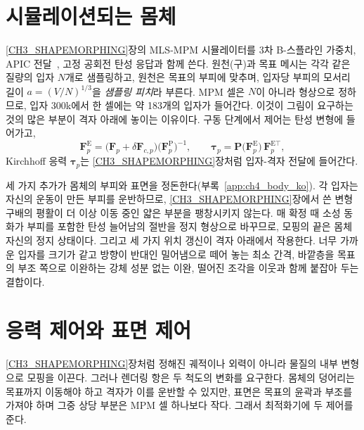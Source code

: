 \section{시뮬레이션되는 몸체}
\label{ch4:sec_body_ko}

\ref{CH3_SHAPEMORPHING}장의 MLS-MPM 시뮬레이터를 3차 B-스플라인 가중치, APIC 전달~\citep{jiang2016material}, 고정 공회전
탄성 응답과 함께 쓴다. 원천(구)과 목표 메시는 각각 같은 질량의 입자 $N$개로 샘플링하고, 원천은 목표의 부피에 맞추며,
입자당 부피의 모서리 길이 $a=(V/N)^{1/3}$을 \emph{샘플링 피치}라 부른다. MPM 셀은 $N$이 아니라 형상으로 정하므로, 입자
300k에서 한 셀에는 약 183개의 입자가 들어간다. 이것이 그림이 요구하는 것의 많은 부분이 격자 아래에 놓이는 이유이다. 구동
단계에서 제어는 탄성 변형에 들어가고,
\begin{equation}
\label{eq:control_F_ko}
\mathbf{F}^{\mathrm{E}}_p=\big(\mathbf{F}_p+\delta\mathbf{F}_{c,p}\big)\big(\mathbf{F}^{\mathrm{P}}_p\big)^{-1},
\qquad
\boldsymbol{\tau}_p=\mathbf{P}\big(\mathbf{F}^{\mathrm{E}}_p\big)\,\mathbf{F}^{\mathrm{E}\top}_p ,
\end{equation}
Kirchhoff 응력 $\boldsymbol{\tau}_p$는 \ref{CH3_SHAPEMORPHING}장처럼 입자-격자 전달에 들어간다.

세 가지 추가가 몸체의 부피와 표면을 정돈한다(부록~\ref{app:ch4_body_ko}). 각 입자는 자신의 운동이 만든 부피를 운반하므로,
\ref{CH3_SHAPEMORPHING}장에서 쓴 변형 구배의 평활이 더 이상 이동 중인 얇은 부분을 팽창시키지 않는다. 매 확정 때 소성 동화가
부피를 포함한 탄성 늘어남의 절반을 정지 형상으로 바꾸므로, 모핑의 끝은 몸체 자신의 정지 상태이다. 그리고 세 가지 위치
갱신이 격자 아래에서 작용한다. 너무 가까운 입자를 크기가 같고 방향이 반대인 밀어냄으로 떼어 놓는 최소 간격, 바깥층을 목표의
부조 쪽으로 이완하는 강체 성분 없는 이완, 떨어진 조각을 이웃과 함께 붙잡아 두는 결합이다.

\section{응력 제어와 표면 제어}
\label{ch4:sec_controls_ko}

\ref{CH3_SHAPEMORPHING}장처럼 정해진 궤적이나 외력이 아니라 물질의 내부 변형으로 모핑을 이끈다. 그러나 렌더링 항은 두
척도의 변화를 요구한다. 몸체의 덩어리는 목표까지 이동해야 하고 격자가 이를 운반할 수 있지만, 표면은 목표의 윤곽과 부조를
가져야 하며 그중 상당 부분은 MPM 셀 하나보다 작다. 그래서 최적화기에 두 제어를 준다.


